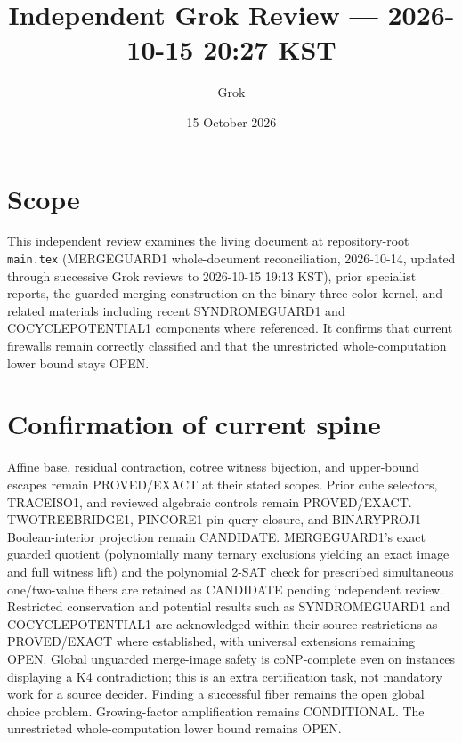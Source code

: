 \documentclass[11pt]{article}
\title{Independent Grok Review --- 2026-10-15 20:27 KST}
\author{Grok}
\date{15 October 2026}
\begin{document}
\maketitle

\begin{center}
\end{center}

\section{Scope}
This independent review examines the living document at repository-root \texttt{main.tex} (MERGEGUARD1 whole-document reconciliation, 2026-10-14, updated through successive Grok reviews to 2026-10-15 19:13 KST), prior specialist reports, the guarded merging construction on the binary three-color kernel, and related materials including recent SYNDROMEGUARD1 and COCYCLEPOTENTIAL1 components where referenced. It confirms that current firewalls remain correctly classified and that the unrestricted whole-computation lower bound stays OPEN.

\section{Confirmation of current spine}
Affine base, residual contraction, cotree witness bijection, and upper-bound escapes remain PROVED/EXACT at their stated scopes. Prior cube selectors, TRACEISO1, and reviewed algebraic controls remain PROVED/EXACT. TWOTREEBRIDGE1, PINCORE1 pin-query closure, and BINARYPROJ1 Boolean-interior projection remain CANDIDATE. MERGEGUARD1's exact guarded quotient (polynomially many ternary exclusions yielding an exact image and full witness lift) and the polynomial 2-SAT check for prescribed simultaneous one/two-value fibers are retained as CANDIDATE pending independent review. Restricted conservation and potential results such as SYNDROMEGUARD1 and COCYCLEPOTENTIAL1 are acknowledged within their source restrictions as PROVED/EXACT where established, with universal extensions remaining OPEN. Global unguarded merge-image safety is coNP-complete even on instances displaying a K4 contradiction; this is an extra certification task, not mandatory work for a source decider. Finding a successful fiber remains the open global choice problem. Growing-factor amplification remains CONDITIONAL. The unrestricted whole-computation lower bound remains OPEN.
\end{document}
